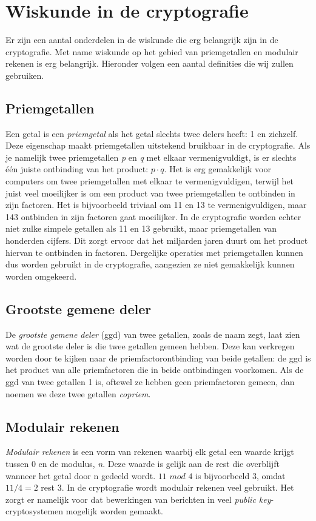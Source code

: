 \documentclass{report} %
\begin{document}
\chapter{Wiskunde in de cryptografie}
Er zijn een aantal onderdelen in de wiskunde die erg belangrijk zijn in de cryptografie. Met name wiskunde op het gebied van priemgetallen en modulair rekenen is erg belangrijk. Hieronder volgen een aantal definities die wij zullen gebruiken.
\section{Priemgetallen}
Een getal is een \textit{priemgetal} als het getal slechts twee delers heeft: 1 en zichzelf. Deze eigenschap maakt priemgetallen uitstekend bruikbaar in de cryptografie. Als je namelijk twee priemgetallen \textit{p} en \textit{q} met elkaar vermenigvuldigt, is er slechts één juiste ontbinding van het product: $p \cdot q$. Het is erg gemakkelijk voor computers om twee priemgetallen met elkaar te vermenigvuldigen, terwijl het juist veel moeilijker is om een product van twee priemgetallen te ontbinden in zijn factoren. Het is bijvoorbeeld triviaal om 11 en 13 te vermenigvuldigen, maar 143 ontbinden in zijn factoren gaat moeilijker. In de cryptografie worden echter niet zulke simpele getallen als 11 en 13 gebruikt, maar priemgetallen van honderden cijfers. Dit zorgt ervoor dat het miljarden jaren duurt om het product hiervan te ontbinden in factoren. Dergelijke operaties met priemgetallen kunnen dus worden gebruikt in de cryptografie, aangezien ze niet gemakkelijk kunnen worden omgekeerd.

\section{Grootste gemene deler}
De \textit{grootste gemene deler} (ggd) van twee getallen, zoals de naam zegt, laat zien wat de grootste deler is die twee getallen gemeen hebben. Deze kan verkregen worden door te kijken naar de priemfactorontbinding van beide getallen: de ggd is het product van alle priemfactoren die in beide ontbindingen voorkomen. Als de ggd van twee getallen 1 is, oftewel ze hebben geen priemfactoren gemeen, dan noemen we deze twee getallen \textit{copriem}.

\section{Modulair rekenen}
\textit{Modulair rekenen} is een vorm van rekenen waarbij elk getal een waarde krijgt tussen 0 en de modulus, \textit{n}. Deze waarde is gelijk aan de rest die overblijft wanneer het getal door n gedeeld wordt. $11 \,\,mod\,\, 4$ is bijvoorbeeld 3, omdat $11/4 = 2$ rest $3$. In de cryptografie wordt modulair rekenen veel gebruikt. Het zorgt er namelijk voor dat bewerkingen van berichten in veel \textit{public key}-cryptosystemen mogelijk worden gemaakt. 
\end{document}
